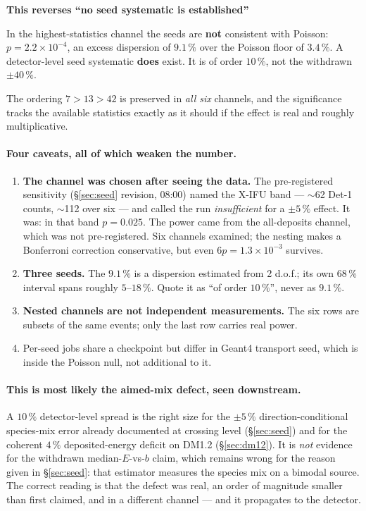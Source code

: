 \documentclass[11pt,a4paper]{article}
\newenvironment{callout}[3]%
{\par\medskip\noindent
 \def\calloutframe{#1}\def\calloutback{#2}%
 \setlength{\fboxrule}{0.9pt}\setlength{\fboxsep}{8pt}%
 \begin{lrbox}{\calloutbox}%
 \begin{minipage}{\dimexpr\textwidth-2\fboxsep-2\fboxrule\relax}%
 \setlength{\parskip}{4pt}%
 \textcolor{#1}{\textbf{#3}}\par\nobreak\smallskip}
{\end{minipage}\end{lrbox}%
 \fcolorbox{\calloutframe}{\calloutback}{\usebox{\calloutbox}}%
 \par\medskip}
\begin{document}
\begin{callout}{warn}{red!4}{This reverses ``no seed systematic is established''}
In the highest-statistics channel the seeds are \textbf{not} consistent with
Poisson: $p = 2.2\times10^{-4}$, an excess dispersion of $\mathbf{9.1\,\%}$ over
the Poisson floor of $3.4\,\%$. A detector-level seed systematic
\textbf{does} exist. It is of order $10\,\%$, not the withdrawn $\pm40\,\%$.

The ordering $7 > 13 > 42$ is preserved in \emph{all six} channels, and the
significance tracks the available statistics exactly as it should if the effect
is real and roughly multiplicative.
\end{callout}

\paragraph{Four caveats, all of which weaken the number.}
\begin{enumerate}[nosep]
  \item \textbf{The channel was chosen after seeing the data.} The
        pre-registered sensitivity (\S\ref{sec:seed} revision, 08:00) named the
        X-IFU band --- $\sim$62 Det-1 counts, $\sim$112 over six --- and called
        the run \emph{insufficient} for a $\pm5\,\%$ effect. It was: in that
        band $p = 0.025$. The power came from the all-deposits channel, which
        was not pre-registered. Six channels examined; the nesting makes a
        Bonferroni correction conservative, but even $6p = 1.3\times10^{-3}$
        survives.
  \item \textbf{Three seeds.} The $9.1\,\%$ is a dispersion estimated from 2
        d.o.f.; its own 68\,\% interval spans roughly $5$--$18\,\%$. Quote it as
        ``of order $10\,\%$'', never as $9.1\,\%$.
  \item \textbf{Nested channels are not independent measurements.} The six rows
        are subsets of the same events; only the last row carries real power.
  \item Per-seed jobs share a checkpoint but differ in Geant4 transport seed,
        which is inside the Poisson null, not additional to it.
\end{enumerate}

\paragraph{This is most likely the aimed-mix defect, seen downstream.} A
$10\,\%$ detector-level spread is the right size for the $\pm5\,\%$
direction-conditional species-mix error already documented at crossing level
(\S\ref{sec:seed}) and for the coherent $4\,\%$ deposited-energy deficit on
DM1.2 (\S\ref{sec:dm12}). It is \emph{not} evidence for the withdrawn
median-$E$-vs-$b$ claim, which remains wrong for the reason given in
\S\ref{sec:seed}: that estimator measures the species mix on a bimodal source.
The correct reading is that the defect was real, an order of magnitude smaller
than first claimed, and in a different channel --- and it propagates to the
detector.
\end{document}
